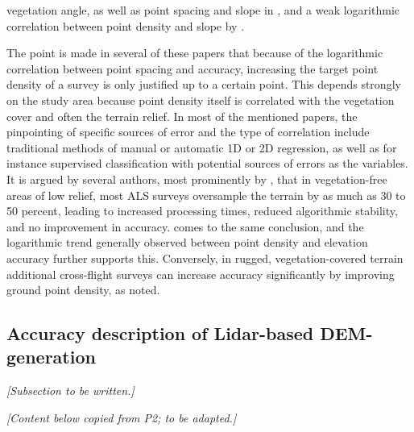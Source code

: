 vegetation angle, as well as point spacing and slope in \cite{peng_shih_2006}, and a weak logarithmic correlation between point density and slope by \cite{chow_hodgson_2009}.

The point is made in several of these papers that because of the logarithmic correlation between point spacing and accuracy, increasing the target point density of a survey is only justified up to a certain point. This depends strongly on the study area because point density itself is correlated with the vegetation cover and often the terrain relief. In most of the mentioned papers, the pinpointing of specific sources of error and the type of correlation include traditional methods of manual or automatic 1D or 2D regression, as well as for instance supervised classification with potential sources of errors as the variables. It is argued by several authors, most prominently by \cite{guo_etal_2010}, that in vegetation-free areas of low relief, most ALS surveys oversample the terrain by as much as 30 to 50 percent, leading to increased processing times, reduced algorithmic stability, and no improvement in accuracy. \cite{bater_coops_2009} comes to the same conclusion, and the logarithmic trend generally observed between point density and elevation accuracy further supports this. Conversely, in rugged, vegetation-covered terrain additional cross-flight surveys can increase accuracy significantly by improving ground point density, as \cite{peng_shih_2006} noted.

\subsection*{Accuracy description of Lidar-based DEM-generation}
\label{sub:lidaraccuracy_dem}

\textit{[Subsection to be written.]}

\textit{[Content below copied from P2; to be adapted.]}

